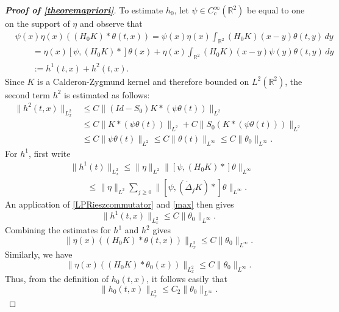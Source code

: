 \documentclass[11pt,reqno,xcolor=svgnames]{amsart}
\def\R{{\mathbb R}}
\theoremstyle{plain}
\theoremstyle{definition}
\theoremstyle{plain}
\theoremstyle{remark}
\newcommand{\Del}{\dot{\Delta}}
\begin{document}
\begin{proof}[\textbf{Proof of \cref{theoremapriori}}]
To estimate $h_0$, let $\psi\in C^{\infty}_c(\R^2)$ be equal to one on the support of $\eta$ and observe that
\begin{equation}\label{DefOfIandII}
\begin{split}
&\psi(x)\eta(x)((H_0K) \ast \theta(t,x) ) = \psi(x)\eta(x)\int_{\R^2} (H_0K)(x-y) \theta(t,y) \, dy\\
&\qquad = \eta(x)[\psi, (H_0K)\ast]\theta(x) + \eta(x)\int_{\R^2} (H_0K)(x-y) \psi(y) \theta(t,y) \, dy\\
& \qquad := h^1(t,x) + h^2(t,x).
\end{split}
\end{equation}
Since $K$ is a Calderon-Zygmund kernel and therefore bounded on $L^2(\R^2)$, the second term $h^2$ is estimated as follows:
\begin{equation*}
\begin{split}
\| h^2(t,x) \|_{L^2_x} &\leq C\|(Id-S_0)K\ast (\psi\theta(t))\|_{L^2}\\
&\leq C\|K\ast (\psi\theta(t))\|_{L^2} + C\|S_0(K\ast (\psi\theta(t)))\|_{L^2}\\
&\leq C\| \psi\theta(t) \|_{L^{2}} \leq C\| \theta(t) \|_{L^{\infty}} \leq C\| \theta_0 \|_{L^{\infty}}.  
\end{split}
\end{equation*}
For $h^1$, first write
\begin{equation}\label{H0stepone}
\begin{split}
&\| h^1(t) \|_{L^2_x} \leq \| \eta \|_{L^2} \|[\psi, (H_0 K)\ast]\theta\|_{L^{\infty}}\\
&\qquad \leq \| \eta \|_{L^2} \sum_{j\geq 0}\|[\psi, (\Del_j K)\ast]\theta\|_{L^{\infty}}.
\end{split}
\end{equation}
An application of \cref{LPRieszcommutator} and \cref{max} then gives
$$ \| h^1(t,x) \|_{L^2_x} \leq C\| \theta_0\|_{L^{\infty}}.$$
Combining the estimates for $h^1$ and $h^2$ gives
\begin{equation}\label{highfreq}
\| \eta(x)((H_0K) \ast \theta(t,x)) \|_{L^2_x} \leq C\|\theta_0 \|_{L^{\infty}}.
\end{equation}  
Similarly, we have
\begin{equation*}
\| \eta(x)((H_0K) \ast \theta_0(x)) \|_{L^2_x} \leq C\|\theta_0 \|_{L^{\infty}}.
\end{equation*}  
Thus, from the definition of $h_0(t,x)$, it follows easily that  
\begin{equation}\label{h0}
\|h_0(t,x) \|_{L^2_x} \leq C_2\|\theta_0 \|_{L^{\infty}}.

\end{equation}
\end{proof}
\end{document}
